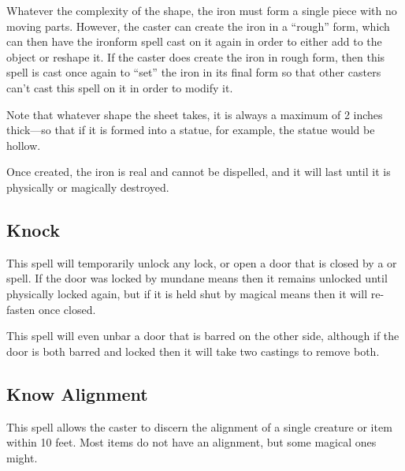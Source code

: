 \begin{multicols*}{2}
Whatever the complexity of the shape, the iron must form a single piece with no moving parts. However, the caster can create the iron in a “rough” form, which can then have the ironform spell cast on it again in order to either add to the object or reshape it. If the caster does create the iron in rough form, then this spell is cast once again to “set” the iron in its final form so that other casters can’t cast this spell on it in order to modify it.

Note that whatever shape the sheet takes, it is always a maximum of 2 inches thick—so that if it is formed into a statue, for example, the statue would be hollow.

Once created, the iron is real and cannot be dispelled, and it will last until it is physically or magically destroyed.

\subsection{Knock}\label{spell:Knock}

This spell will temporarily unlock any lock, or open a door that is closed by a  or  spell. If the door was locked by mundane means then it remains unlocked until physically locked again, but if it is held shut by magical means then it will re-fasten once closed.

This spell will even unbar a door that is barred on the other side, although if the door is both barred and locked then it will take two castings to remove both.

\subsection{Know Alignment}\label{spell:Know Alignment}

This spell allows the caster to discern the alignment of a single creature or item within 10 feet. Most items do not have an alignment, but some magical ones might.


\end{multicols*}
